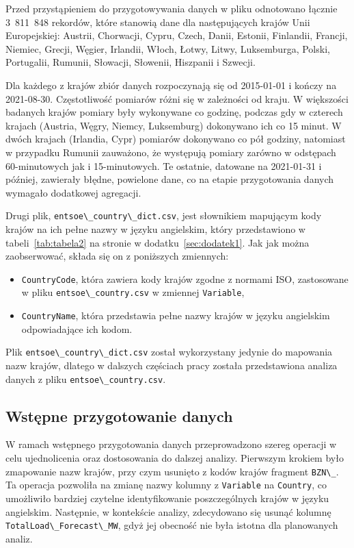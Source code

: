 \documentclass[polish, twoside, 12pt, a4paper]{article}
\theoremstyle{definition}
\theoremstyle{plain}
\theoremstyle{remark}
\newcommand{\code}[1]{\lstinline{#1}}
\begin{document}
Przed przystąpieniem do przygotowywania danych w pliku odnotowano łącznie 3~811~848 rekordów, które stanowią dane dla następujących krajów Unii Europejskiej: Austrii, Chorwacji, Cypru, Czech, Danii, Estonii, Finlandii, Francji, Niemiec, Grecji, Węgier, Irlandii, Włoch, Łotwy, Litwy, Luksemburga, Polski, Portugalii, Rumunii, Słowacji, Słowenii, Hiszpanii i Szwecji. 

Dla każdego z krajów zbiór danych rozpoczynają się od 2015-01-01 i kończy na 2021-08-30. Częstotliwość pomiarów różni się w zależności od kraju. W większości badanych krajów pomiary były wykonywane co godzinę, podczas gdy w czterech krajach (Austria, Węgry, Niemcy, Luksemburg) dokonywano ich co 15 minut. W dwóch krajach (Irlandia, Cypr) pomiarów dokonywano co pół godziny, natomiast w przypadku Rumunii zauważono, że występują pomiary zarówno w odstępach 60-minutowych jak i 15-minutowych. Te ostatnie, datowane na 2021-01-31 i później, zawierały błędne, powielone dane, co na etapie przygotowania danych wymagało dodatkowej agregacji. 

Drugi plik, \code{entsoe\_country\_dict.csv}, jest słownikiem mapującym kody krajów na ich pełne nazwy w języku angielskim, który przedstawiono  w tabeli~\ref{tab:tabela2} na stronie \pageref{tab:tabela2} w dodatku~\ref{sec:dodatek1}. Jak jak można zaobserwować, składa się on z poniższych zmiennych:
\begin{itemize}[noitemsep]
    \item \code{CountryCode}, która zawiera kody krajów zgodne z normami ISO, zastosowane w pliku \code{entsoe\_country.csv} w zmiennej \code{Variable},
    \item \code{CountryName}, która przedstawia pełne nazwy krajów w języku angielskim odpowiadające ich kodom.
\end{itemize}

Plik \code{entsoe\_country\_dict.csv} został wykorzystany jedynie do mapowania nazw krajów, dlatego w dalszych częściach pracy została przedstawiona analiza danych z pliku \code{entsoe\_country.csv}.

\subsection{Wstępne przygotowanie danych}\label{przygotowanie-danych}

W ramach wstępnego przygotowania danych przeprowadzono szereg operacji w celu ujednolicenia oraz dostosowania do dalszej analizy. 
Pierwszym krokiem było zmapowanie nazw krajów, przy czym usunięto z kodów krajów fragment \code{BZN\_}. Ta operacja pozwoliła na zmianę nazwy kolumny z \code{Variable} na \code{Country}, co umożliwiło bardziej czytelne identyfikowanie poszczególnych krajów w języku angielskim. Następnie, w kontekście analizy, zdecydowano się usunąć kolumnę \code{TotalLoad\_Forecast\_MW}, gdyż jej obecność nie była istotna dla planowanych analiz.
\end{document}
